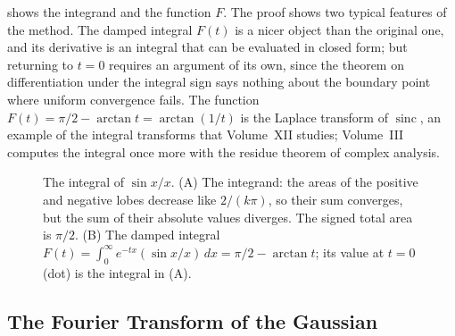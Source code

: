  shows the integrand and the function $F$. The proof shows two typical features of the method. The damped integral $F(t)$ is a nicer object than the original one, and its derivative is an integral that can be evaluated in closed form; but returning to $t=0$ requires an argument of its own, since the theorem on differentiation under the integral sign says nothing about the boundary point where uniform convergence fails. The function $F(t)=\pi/2-\arctan t=\arctan(1/t)$ is the Laplace transform of $\operatorname{sinc}$, an example of the integral transforms that Volume~XII studies; Volume~III computes the integral once more with the residue theorem of complex analysis.

\begin{figure}
\hfill
{}
\caption{The integral of $\sin x/x$. (A) The integrand: the areas of the positive and negative lobes decrease like $2/(k\pi)$, so their sum converges, but the sum of their absolute values diverges. The signed total area is $\pi/2$. (B) The damped integral $F(t)=\int_0^\infty e^{-tx}(\sin x/x)\,dx=\pi/2-\arctan t$; its value at $t=0$ (dot) is the integral in (A).}
\label{fig:sinc}
\end{figure}

\subsection{The Fourier Transform of the Gaussian}

